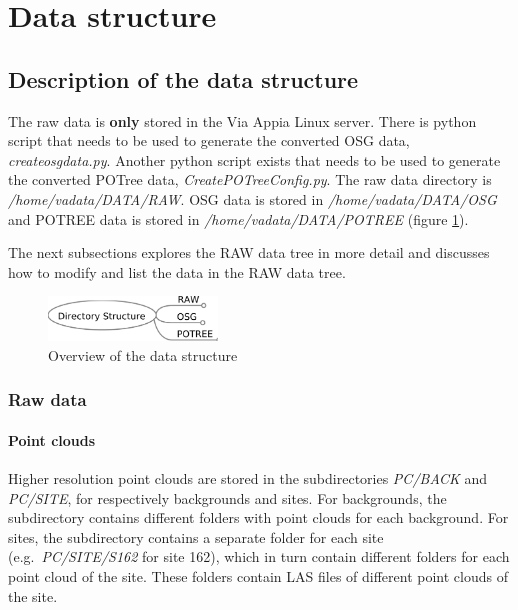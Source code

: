 \section{Data structure}
\label{sec:data_structure}

\subsection{Description of the data structure}
\label{sec:descriptiondata}
The raw data is \textbf{only} stored in the Via Appia Linux server. There is python script that needs to be used to generate the converted OSG data, \textit{createosgdata.py}. Another python script exists that needs to be used to generate the converted POTree data, \textit{CreatePOTreeConfig.py}.
The raw data directory is \textit{/home/vadata/DATA/RAW}. OSG data is stored in \textit{/home/vadata/DATA/OSG} and POTREE data is stored in \textit{/home/vadata/DATA/POTREE} (figure \ref{fig:directory_structure_overview}). 

The next subsections explores the RAW data tree in more detail and discusses how to modify and list the data in the RAW data tree.

\begin{figure}[!ht]
 \centering
 \includegraphics[width=0.4\textwidth]{fig/directory_structure_overview}
 \caption{Overview of the data structure}
 \label{fig:directory_structure_overview}
\end{figure}

\subsubsection{Raw data}
\paragraph{Point clouds}
Higher resolution point clouds are stored in the subdirectories \textit{PC/BACK} and \textit{PC/SITE}, for respectively backgrounds and sites. For backgrounds, the subdirectory contains different folders with point clouds for each background. For sites, the subdirectory contains a separate folder for each site (e.g.\ \textit{PC/SITE/S162} for site 162), which in turn contain different folders for each point cloud of the site. These folders contain LAS files of different point clouds of the site. 

